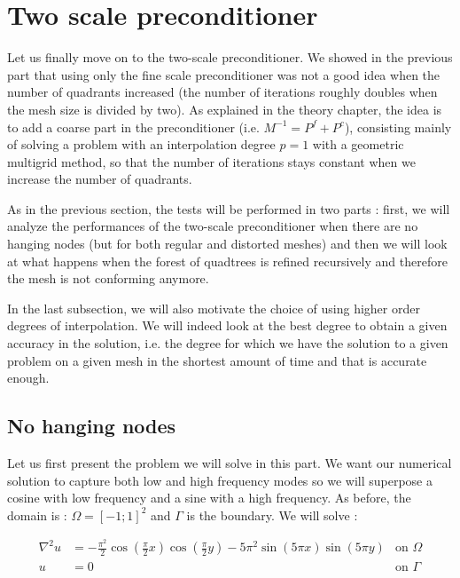 \section{Two scale preconditioner}

Let us finally move on to the two-scale preconditioner. We showed in the previous part that using only the fine scale preconditioner was not a good idea when the number of quadrants increased (the number of iterations roughly doubles when the mesh size is divided by two). As explained in the theory chapter, the idea is to add a coarse part in the preconditioner (i.e. $M^{-1} = P^f + P^c$), consisting mainly of solving a problem with an interpolation degree $p=1$ with a geometric multigrid method, so that the number of iterations stays constant when we increase the number of quadrants.  

As in the previous section, the tests will be performed in two parts : first, we will analyze the performances of the two-scale preconditioner when there are no hanging nodes (but for both regular and distorted meshes) and then we will look at what happens when the forest of quadtrees is refined recursively and therefore the mesh is not conforming anymore. 

In the last subsection, we will also motivate the choice of using higher order degrees of interpolation. We will indeed look at the best degree to obtain a given accuracy in the solution, i.e. the degree for which we have the solution to a given problem on a given mesh in the shortest amount of time and that is accurate enough. 

\subsection{No hanging nodes}

Let us first present the problem we will solve in this part. We want our numerical solution to capture both low and high frequency modes so we will superpose a cosine with low frequency and a sine with a high frequency. As before, the domain is : $\Omega = \left[ -1;1 \right]^2$ and $\Gamma$ is the boundary. We will solve : 

\begin{align}
\nabla^2 u &= -\frac{\pi^2}{2}\cos(\frac{\pi}{2}x)\cos(\frac{\pi}{2}y) - 5\pi^2\sin(5\pi x)\sin(5\pi y) &\text{on $\Omega$} \label{eq:prob_two}\\
u &= 0  &\text{on $\Gamma$}
\end{align}


